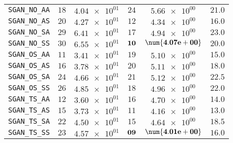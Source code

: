 \begin{xltabular}{\textwidth}{l||CC|CC||C}
	\texttt{SGAN\_NO\_AA} & $ 18$ & $ \num{4.04e+01}$ & $ 24$ & $ \num{5.66e+00}$ &$ 21.0$  \\
	\texttt{SGAN\_NO\_AS} & $ 20$ & $ \num{4.27e+01}$ & $ 12$ & $ \num{4.34e+00}$ &$ 16.0$  \\
	\texttt{SGAN\_NO\_SA} & $ 29$ & $ \num{6.41e+01}$ & $ 17$ & $ \num{4.94e+00}$ &$ 23.0$  \\
	\texttt{SGAN\_NO\_SS} & $ 30$ & $ \num{6.55e+01}$ & $\bf 10$ & $\bf \num{4.07e+00}$ &$ 20.0$  \\
	\texttt{SGAN\_OS\_AA} & $ 11$ & $ \num{3.41e+01}$ & $ 19$ & $ \num{5.10e+00}$ &$ 15.0$  \\
	\texttt{SGAN\_OS\_AS} & $ 16$ & $ \num{3.78e+01}$ & $ 20$ & $ \num{5.11e+00}$ &$ 18.0$  \\
	\texttt{SGAN\_OS\_SA} & $ 24$ & $ \num{4.66e+01}$ & $ 21$ & $ \num{5.12e+00}$ &$ 22.5$  \\
	\texttt{SGAN\_OS\_SS} & $ 26$ & $ \num{4.85e+01}$ & $ 18$ & $ \num{4.96e+00}$ &$ 22.0$  \\
	\texttt{SGAN\_TS\_AA} & $ 12$ & $ \num{3.60e+01}$ & $ 16$ & $ \num{4.70e+00}$ &$ 14.0$  \\
	\texttt{SGAN\_TS\_AS} & $ 15$ & $ \num{3.73e+01}$ & $ 11$ & $ \num{4.16e+00}$ &$ 13.0$  \\
	\texttt{SGAN\_TS\_SA} & $ 22$ & $ \num{4.50e+01}$ & $ 15$ & $ \num{4.64e+00}$ &$ 18.5$  \\
	\texttt{SGAN\_TS\_SS} & $ 23$ & $ \num{4.57e+01}$ & $\bf 09$ & $\bf \num{4.01e+00}$ &$ 16.0$  \\ \hline

\end{xltabular}
